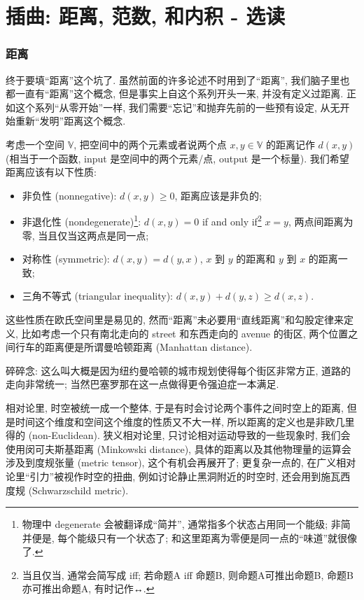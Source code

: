 \section{插曲: 距离, 范数, 和内积 - 选读}\label{027}

\subsubsection{距离}

终于要填``距离''这个坑了. 虽然前面的许多论述不时用到了``距离'',
我们脑子里也都一直有``距离''这个概念, 但是事实上自这个系列开头一来,
并没有定义过距离. 正如这个系列``从零开始''一样,
我们需要``忘记''和抛弃先前的一些预有设定,
从无开始重新``发明''距离这个概念.

考虑一个空间 \(\mathbb{V}\), 把空间中的两个元素或者说两个点
\(x,y\in\mathbb{V}\) 的距离记作 \(d(x,y)\) (相当于一个函数, input
是空间中的两个元素/点, output 是一个标量). 我们希望距离应该有以下性质:

\begin{itemize}
\item
  非负性 (nonnegative): \(d(x,y)\ge0\), 距离应该是非负的;
\item
  非退化性 (nondegenerate)\footnote{物理中 degenerate
    会被翻译成``简并'', 通常指多个状态占用同一个能级; 非简并便是,
    每个能级只有一个状态了; 和这里距离为零便是同一点的``味道''就很像了.}:
  \(d(x,y)=0\) if and only if\footnote{当且仅当, 通常会简写成 iff;
    若命题A iff 命题B, 则命题A可推出命题B, 命题B亦可推出命题A,
    有时记作↔️.} \(x=y\), 两点间距离为零, 当且仅当这两点是同一点;
\item
  对称性 (symmetric): \(d(x,y)=d(y,x)\), \(x\) 到 \(y\) 的距离和 \(y\)
  到 \(x\) 的距离一致;
\item
  三角不等式 (triangular inequality): \(d(x,y)+d(y,z)\ge d(x,z)\).
\end{itemize}

这些性质在欧氏空间里是易见的,
然而``距离''未必要用``直线距离''和勾股定律来定义,
比如考虑一个只有南北走向的 street 和东西走向的 avenue 的街区,
两个位置之间行车的距离便是所谓曼哈顿距离 (Manhattan distance).

\begin{newquote}
碎碎念: 这么叫大概是因为纽约曼哈顿的城市规划使得每个街区非常方正,
道路的走向非常统一; 当然巴塞罗那在这一点做得更令强迫症一本满足.

相对论里, 时空被统一成一个整体, 于是有时会讨论两个事件之间时空上的距离,
但是时间这个维度和空间这个维度的性质又不大一样,
所以距离的定义也是非欧几里得的 (non-Euclidean). 狭义相对论里,
只讨论相对运动导致的一些现象时, 我们会使用闵可夫斯基距离 (Minkowski
distance), 具体的距离以及其他物理量的运算会涉及到度规张量 (metric
tensor), 这个有机会再展开了; 更复杂一点的,
在广义相对论里``引力''被视作时空的扭曲, 例如讨论静止黑洞附近的时空时,
还会用到施瓦西度规 (Schwarzschild metric).
\end{newquote}

